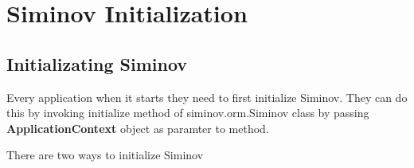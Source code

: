 \newpage
\chapter {\Large{Siminov Initialization}}

\section{Initializating Siminov}
Every application when it starts they need to first initialize Siminov. They can do this by invoking initialize method of siminov.orm.Siminov class by passing \textbf{ApplicationContext} object as paramter to method.

\par
There are two ways to initialize Siminov

